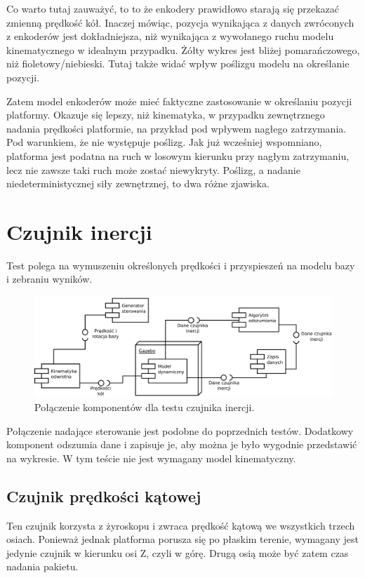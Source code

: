 		Co warto tutaj zauważyć, to to że enkodery prawidłowo starają się przekazać zmienną prędkość kół. 
		Inaczej mówiąc, pozycja wynikająca z danych zwróconych z enkoderów jest dokładniejsza, niż wynikająca z wywołanego ruchu modelu kinematycznego w idealnym przypadku.
		Żółty wykres jest bliżej pomarańczowego, niż fioletowy/niebieski.
		Tutaj także widać wpływ poślizgu modelu na określanie pozycji.
		
		Zatem model enkoderów może mieć faktyczne zastosowanie w określaniu pozycji platformy. 
		Okazuje się lepszy, niż kinematyka, w przypadku zewnętrznego nadania prędkości platformie, na przykład pod wpływem nagłego zatrzymania.
		Pod warunkiem, że nie występuje poślizg. Jak już wcześniej wspomniano, platforma jest podatna na ruch w losowym kierunku przy nagłym zatrzymaniu,
		lecz nie zawsze taki ruch może zostać niewykryty. Poślizg, a nadanie niedeterministycznej siły zewnętrznej, to dwa różne zjawiska.
		
\section{Czujnik inercji}
\label{sec:test_imu}
	Test polega na wymuszeniu określonych prędkości i przyspieszeń na modelu bazy i zebraniu wyników.
	
	\begin{figure}[H]
		\centering
		\includegraphics[width=\textwidth]{uml/wewucho.pdf}
		\caption{Połączenie komponentów dla testu czujnika inercji.}
		\label{uml:wewucho}
	\end{figure}
	
	Połączenie nadające sterowanie jest podobne do poprzednich testów.
	Dodatkowy komponent odszumia dane i zapisuje je, aby można je było wygodnie przedstawić na wykresie.
	W tym teście nie jest wymagany model kinematyczny.
	
	\subsection{Czujnik prędkości kątowej}
		Ten czujnik korzysta z żyroskopu i zwraca prędkość kątową we wszystkich trzech osiach.
		Ponieważ jednak platforma porusza się po płaskim terenie, wymagany jest jedynie czujnik w kierunku osi Z, czyli w górę.
		Drugą osią może być zatem czas nadania pakietu.
		
